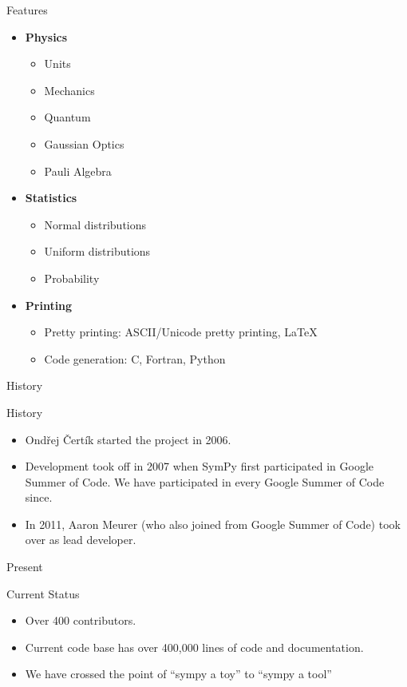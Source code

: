 \documentclass[xcolor=svgnames]{beamer}
\begin{document}
\begin{frame}{Features}
\begin{multicols}{2}
\begin{itemize}
      \item \textbf{Physics}
        \begin{itemize}
          \tiny
        \item Units
        \item Mechanics
        \item Quantum
        \item Gaussian Optics
        \item Pauli Algebra
        \end{itemize}

      \item \textbf{Statistics}
        \begin{itemize}
          \tiny
        \item Normal distributions
        \item Uniform distributions
        \item Probability
        \end{itemize}

      \item \textbf{Printing}
        \begin{itemize}
          \tiny
        \item Pretty printing: ASCII/Unicode pretty printing, LaTeX
        \item Code generation: C, Fortran, Python
        \end{itemize}
      \end{itemize}
    \end{multicols}
  \end{frame}

  \begin{frame}{History}
    \begin{block}{History}
      \begin{itemize}
      \item Ondřej Čertík started the project in 2006.
      \item Development took off in 2007 when SymPy first participated in Google
        Summer of Code. We have participated in every Google Summer of Code since.
      \item In 2011, Aaron Meurer (who also joined from Google Summer of Code) took
        over as lead developer.
      \end{itemize}
    \end{block}
  \end{frame}

  \begin{frame}{Present}
    \begin{block}{Current Status}
      \begin{itemize}
      \item Over 400 contributors.
      \item Current code base has over 400,000 lines of code and documentation.
      \item We have crossed the point of ``sympy a toy'' to ``sympy a tool''
      \end{itemize}
    \end{block}
  \end{frame}
\end{document}
